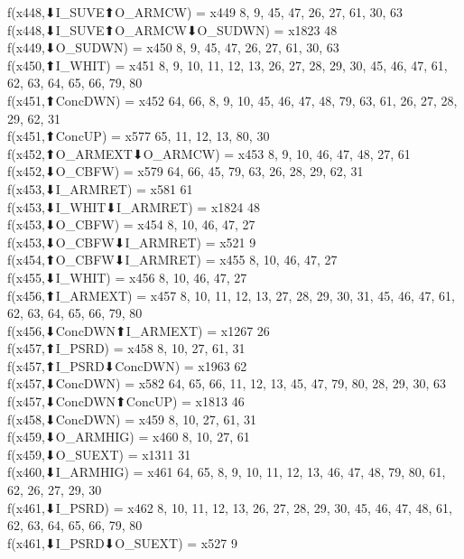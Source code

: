 f(x448,⬇I_SUVE⬆O_ARMCW) = x449 {8, 9, 45, 47, 26, 27, 61, 30, 63} \\
f(x448,⬇I_SUVE⬆O_ARMCW⬇O_SUDWN) = x1823 {48} \\
f(x449,⬇O_SUDWN) = x450 {8, 9, 45, 47, 26, 27, 61, 30, 63} \\
f(x450,⬆I_WHIT) = x451 {8, 9, 10, 11, 12, 13, 26, 27, 28, 29, 30, 45, 46, 47, 61, 62, 63, 64, 65, 66, 79, 80} \\
f(x451,⬆ConcDWN) = x452 {64, 66, 8, 9, 10, 45, 46, 47, 48, 79, 63, 61, 26, 27, 28, 29, 62, 31} \\
f(x451,⬆ConcUP) = x577 {65, 11, 12, 13, 80, 30} \\
f(x452,⬆O_ARMEXT⬇O_ARMCW) = x453 {8, 9, 10, 46, 47, 48, 27, 61} \\
f(x452,⬇O_CBFW) = x579 {64, 66, 45, 79, 63, 26, 28, 29, 62, 31} \\
f(x453,⬇I_ARMRET) = x581 {61} \\
f(x453,⬇I_WHIT⬇I_ARMRET) = x1824 {48} \\
f(x453,⬇O_CBFW) = x454 {8, 10, 46, 47, 27} \\
f(x453,⬇O_CBFW⬇I_ARMRET) = x521 {9} \\
f(x454,⬆O_CBFW⬇I_ARMRET) = x455 {8, 10, 46, 47, 27} \\
f(x455,⬇I_WHIT) = x456 {8, 10, 46, 47, 27} \\
f(x456,⬆I_ARMEXT) = x457 {8, 10, 11, 12, 13, 27, 28, 29, 30, 31, 45, 46, 47, 61, 62, 63, 64, 65, 66, 79, 80} \\
f(x456,⬇ConcDWN⬆I_ARMEXT) = x1267 {26} \\
f(x457,⬆I_PSRD) = x458 {8, 10, 27, 61, 31} \\
f(x457,⬆I_PSRD⬇ConcDWN) = x1963 {62} \\
f(x457,⬇ConcDWN) = x582 {64, 65, 66, 11, 12, 13, 45, 47, 79, 80, 28, 29, 30, 63} \\
f(x457,⬇ConcDWN⬆ConcUP) = x1813 {46} \\
f(x458,⬇ConcDWN) = x459 {8, 10, 27, 61, 31} \\
f(x459,⬇O_ARMHIG) = x460 {8, 10, 27, 61} \\
f(x459,⬇O_SUEXT) = x1311 {31} \\
f(x460,⬇I_ARMHIG) = x461 {64, 65, 8, 9, 10, 11, 12, 13, 46, 47, 48, 79, 80, 61, 62, 26, 27, 29, 30} \\
f(x461,⬇I_PSRD) = x462 {8, 10, 11, 12, 13, 26, 27, 28, 29, 30, 45, 46, 47, 48, 61, 62, 63, 64, 65, 66, 79, 80} \\
f(x461,⬇I_PSRD⬇O_SUEXT) = x527 {9} \\
